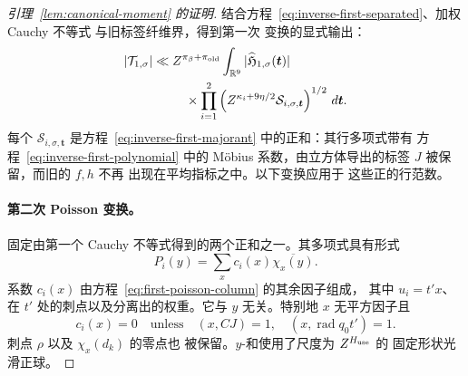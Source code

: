 \documentclass[11pt,a4paper]{article}
\numberwithin{equation}{section}
\numberwithin{figure}{section}
\theoremstyle{definition}
\theoremstyle{remark}
\begin{document}
\begin{proof}[引理~\ref{lem:canonical-moment} 的证明]
结合方程~\eqref{eq:inverse-first-separated}、加权 Cauchy 不等式
与旧标签纤维界，得到第一次
变换的显式输出：
\begin{equation}\label{eq:inverse-first-transform-output}
 \begin{split}
 |\mathcal T_{1,\sigma}|\ll{}&Z^{\pi_\beta+\pi_{\rm old}}
 \int_{\mathbb R^9}|\widehat{\mathfrak H}_{1,\sigma}(\boldsymbol t)|\\
 &\quad\times\prod_{i=1}^2
 \left(Z^{\kappa_i+9\eta/2}\mathcal S_{i,\sigma,\boldsymbol t}\right)^{1/2}
 \,d\boldsymbol t.
 \end{split}
\end{equation}
每个 \(\mathcal S_{i,\sigma,\boldsymbol t}\) 是方程~\eqref{eq:inverse-first-majorant}
中的正和：其行多项式带有
方程~\eqref{eq:inverse-first-polynomial} 中的
M\"obius 系数，由立方体导出的标签 \(J\) 被保留，而旧的 \(f,h\) 不再
出现在平均指标之中。以下变换应用于
这些正的行范数。

\paragraph{第二次 Poisson 变换。}
固定由第一个 Cauchy
不等式得到的两个正和之一。其多项式具有形式
\[
 P_i(y)=\sum_x c_i(x)\overline{\chi_x(y)}.
\]
系数 \(c_i(x)\) 由方程~\eqref{eq:first-poisson-column} 的其余因子组成，
其中 \(u_i=t'x\)、在 \(t'\) 处的刺点以及分离出的权重。它与
\(y\) 无关。特别地 \(x\) 无平方因子且
\[
 c_i(x)=0\quad\text{unless}\quad
 (x,CJ)=1,\quad (x,\operatorname{rad}q_0t')=1.
\]
刺点 \(\rho\) 以及 \(\chi_x(d_k)\) 的零点也
被保留。\(y\)-和使用了尺度为 \(Z^{H_{\rm use}}\) 的
固定形状光滑正球。


\end{proof}
\end{document}
